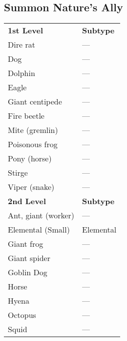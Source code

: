 \subsection{Summon Nature's Ally}
\begin{tabular}{ll}
\textbf{1st Level}                            & \textbf{Subtype} \\
Dire rat                                      & ---                \\
Dog                                           & ---                \\
Dolphin                                       & ---                \\
Eagle                                         & ---                \\
Giant centipede                               & ---                \\
Fire beetle                                   & ---                \\
Mite (gremlin)                                & ---                \\
Poisonous frog                                & ---                \\
Pony (horse)                                  & ---                \\
Stirge                                        & ---                \\
Viper (snake)                                 & ---                \\
\textbf{2nd Level}                            & \textbf{Subtype} \\
Ant, giant (worker)                           & ---                \\
Elemental (Small)                             & Elemental        \\
Giant frog                                    & ---                \\
Giant spider                                  & ---                \\
Goblin Dog                                    & ---                \\
Horse                                         & ---                \\
Hyena                                         & ---                \\
Octopus                                       & ---                \\
Squid                                         & ---                \\

\end{tabular}
